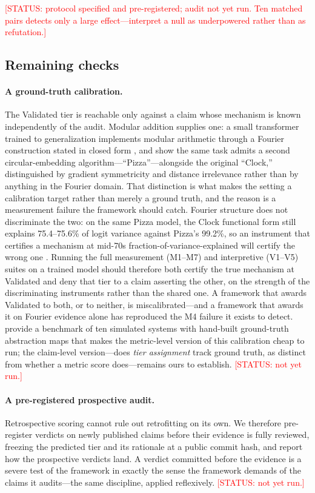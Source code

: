 \documentclass{article}
\begin{document}
\textcolor{red}{[STATUS: protocol specified and pre-registered; audit not yet run. Ten matched pairs detects only a large effect---interpret a null as underpowered rather than as refutation.]}

\subsection{Remaining checks}

\paragraph{A ground-truth calibration.} The Validated tier is reachable only against a claim whose mechanism is known independently of the audit. Modular addition supplies one: a small transformer trained to generalization implements modular arithmetic through a Fourier construction stated in closed form \citep{nanda2023progress}, and \citet{zhong2023clock} show the same task admits a second circular-embedding algorithm---``Pizza''---alongside the original ``Clock,'' distinguished by gradient symmetricity and distance irrelevance rather than by anything in the Fourier domain. That distinction is what makes the setting a calibration target rather than merely a ground truth, and the reason is a measurement failure the framework should catch. Fourier structure does not discriminate the two: on the same Pizza model, the Clock functional form still explains 75.4--75.6\% of logit variance against Pizza's 99.2\%, so an instrument that certifies a mechanism at mid-70s fraction-of-variance-explained will certify the wrong one \citep[Table~2]{zhong2023clock}. Running the full measurement (M1--M7) and interpretive (V1--V5) suites on a trained model should therefore both certify the true mechanism at Validated and deny that tier to a claim asserting the other, on the strength of the discriminating instruments rather than the shared one. A framework that awards Validated to both, or to neither, is miscalibrated---and a framework that awards it on Fourier evidence alone has reproduced the M4 failure it exists to detect. \citet{meloux2026validating} provide a benchmark of ten simulated systems with hand-built ground-truth abstraction maps that makes the metric-level version of this calibration cheap to run; the claim-level version---does \emph{tier assignment} track ground truth, as distinct from whether a metric score does---remains ours to establish. \textcolor{red}{[STATUS: not yet run.]}

\paragraph{A pre-registered prospective audit.} Retrospective scoring cannot rule out retrofitting on its own. We therefore pre-register verdicts on newly published claims before their evidence is fully reviewed, freezing the predicted tier and its rationale at a public commit hash, and report how the prospective verdicts land. A verdict committed before the evidence is a severe test of the framework in exactly the sense the framework demands of the claims it audits---the same discipline, applied reflexively. \textcolor{red}{[STATUS: not yet run.]}
\end{document}
